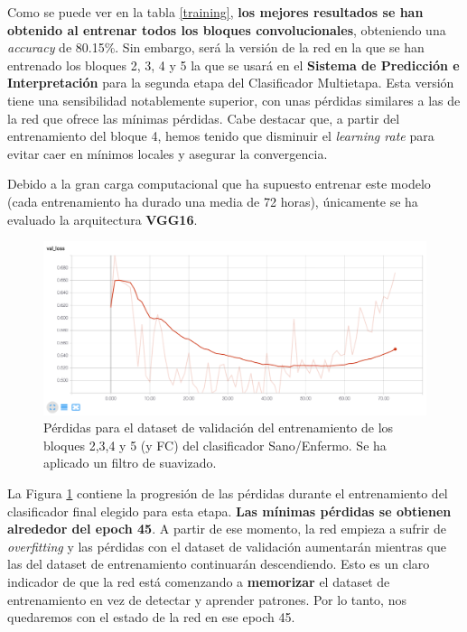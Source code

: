 \documentclass[
  12pt,
  spanish,
  a4paperpaper,
]{report}
\begin{document}
Como se puede ver en la tabla \ref{training}, \textbf{los mejores
resultados se han obtenido al entrenar todos los bloques
convolucionales}, obteniendo una \emph{accuracy} de 80.15\%. Sin
embargo, será la versión de la red en la que se han entrenado los
bloques 2, 3, 4 y 5 la que se usará en el \textbf{Sistema de Predicción
e Interpretación} para la segunda etapa del Clasificador Multietapa.
Esta versión tiene una sensibilidad notablemente superior, con unas
pérdidas similares a las de la red que ofrece las mínimas pérdidas. Cabe
destacar que, a partir del entrenamiento del bloque 4, hemos tenido que
disminuir el \emph{learning rate} para evitar caer en mínimos locales y
asegurar la convergencia.

Debido a la gran carga computacional que ha supuesto entrenar este
modelo (cada entrenamiento ha durado una media de 72 horas), únicamente
se ha evaluado la arquitectura \textbf{VGG16}.

\begin{figure}
\centering
\includegraphics[width=1\textwidth,height=\textheight]{source/figures/loss1.png}
\caption{Pérdidas para el dataset de validación del entrenamiento de los
bloques 2,3,4 y 5 (y FC) del clasificador Sano/Enfermo. Se ha aplicado
un filtro de suavizado. \label{valloss}}
\end{figure}

La Figura \ref{valloss} contiene la progresión de las pérdidas durante
el entrenamiento del clasificador final elegido para esta etapa.
\textbf{Las mínimas pérdidas se obtienen alrededor del epoch 45}. A
partir de ese momento, la red empieza a sufrir de \emph{overfitting} y
las pérdidas con el dataset de validación aumentarán mientras que las
del dataset de entrenamiento continuarán descendiendo. Esto es un claro
indicador de que la red está comenzando a \textbf{memorizar} el dataset
de entrenamiento en vez de detectar y aprender patrones. Por lo tanto,
nos quedaremos con el estado de la red en ese epoch 45.
\end{document}

